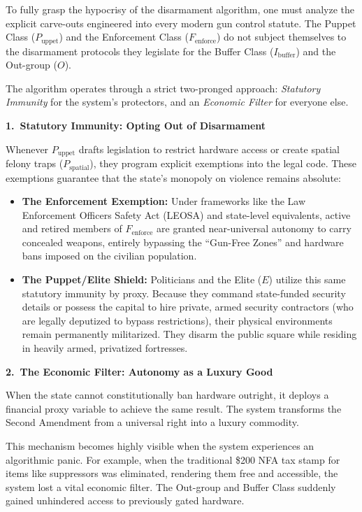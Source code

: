 \documentclass[12pt,openany]{book}
\begin{document}
To fully grasp the hypocrisy of the disarmament algorithm, one must analyze the explicit carve-outs engineered into every modern gun control statute. The Puppet Class ($P_{\text{uppet}}$) and the Enforcement Class ($F_{\text{enforce}}$) do not subject themselves to the disarmament protocols they legislate for the Buffer Class ($I_{\text{buffer}}$) and the Out-group ($O$).

The algorithm operates through a strict two-pronged approach: \textit{Statutory Immunity} for the system's protectors, and an \textit{Economic Filter} for everyone else.

\medskip
\noindent\textbf{1.\ Statutory Immunity: Opting Out of Disarmament}

\noindent Whenever $P_{\text{uppet}}$ drafts legislation to restrict hardware access or create spatial felony traps ($P_{\text{spatial}}$), they program explicit exemptions into the legal code. These exemptions guarantee that the state's monopoly on violence remains absolute:

\begin{itemize}
    \item \textbf{The Enforcement Exemption:} Under frameworks like the Law Enforcement Officers Safety Act (LEOSA) and state-level equivalents, active and retired members of $F_{\text{enforce}}$ are granted near-universal autonomy to carry concealed weapons, entirely bypassing the ``Gun-Free Zones'' and hardware bans imposed on the civilian population.

    \item \textbf{The Puppet/Elite Shield:} Politicians and the Elite ($E$) utilize this same statutory immunity by proxy. Because they command state-funded security details or possess the capital to hire private, armed security contractors (who are legally deputized to bypass restrictions), their physical environments remain permanently militarized. They disarm the public square while residing in heavily armed, privatized fortresses.
\end{itemize}

\medskip
\noindent\textbf{2.\ The Economic Filter: Autonomy as a Luxury Good}

\noindent When the state cannot constitutionally ban hardware outright, it deploys a financial proxy variable to achieve the same result. The system transforms the Second Amendment from a universal right into a luxury commodity.

This mechanism becomes highly visible when the system experiences an algorithmic panic. For example, when the traditional \$200 NFA tax stamp for items like suppressors was eliminated, rendering them free and accessible, the system lost a vital economic filter. The Out-group and Buffer Class suddenly gained unhindered access to previously gated hardware.
\end{document}

